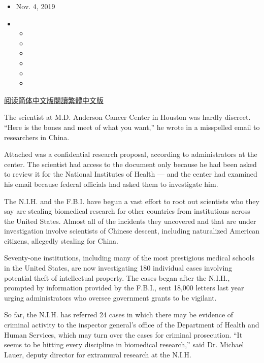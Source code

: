 \begin{itemize}
\item
  Nov. 4, 2019
\item
  \begin{itemize}
  \item
  \item
  \item
  \item
  \item
  \item
  \end{itemize}
\end{itemize}

\href{https://cn.nytimes.com/usa/20191105/china-nih-scientists/}{阅读简体中文版}\href{https://cn.nytimes.com/usa/20191105/china-nih-scientists/zh-hant/}{閱讀繁體中文版}

The scientist at M.D. Anderson Cancer Center in Houston was hardly
discreet. ``Here is the bones and meet of what you want,'' he wrote in a
misspelled email to researchers in China.

Attached was a confidential research proposal, according to
administrators at the center. The scientist had access to the document
only because he had been asked to review it for the National Institutes
of Health --- and the center had examined his email because federal
officials had asked them to investigate him.

The N.I.H. and the F.B.I. have begun a vast effort to root out
scientists who they say are stealing biomedical research for other
countries from institutions across the United States. Almost all of the
incidents they uncovered and that are under investigation involve
scientists of Chinese descent, including naturalized American citizens,
allegedly stealing for China.

Seventy-one institutions, including many of the most prestigious medical
schools in the United States, are now investigating 180 individual cases
involving potential theft of intellectual property. The cases began
after the N.I.H., prompted by information provided by the F.B.I., sent
18,000 letters last year urging administrators who oversee government
grants to be vigilant.

So far, the N.I.H. has referred 24 cases in which there may be evidence
of criminal activity to the inspector general's office of the Department
of Health and Human Services, which may turn over the cases for criminal
prosecution. ``It seems to be hitting every discipline in biomedical
research,'' said Dr. Michael Lauer, deputy director for extramural
research at the N.I.H.

